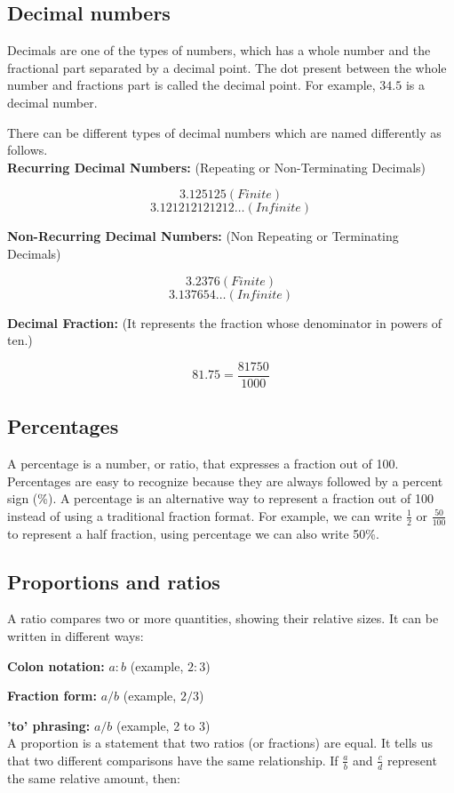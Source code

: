 \documentclass{article} %
\begin{document}
\subsection{Decimal numbers}
Decimals are one of the types of numbers, which has a whole number and the fractional part separated by a decimal point. The dot present between the whole number and fractions part is called the decimal point. For example, $34.5$ is a decimal number.

There can be different types of decimal numbers which are named differently as follows.\\

\textbf{Recurring Decimal Numbers:} (Repeating or Non-Terminating Decimals)

\[
3.125125 (Finite)
\]
\[
3.121212121212\dots (Infinite)
\]

\textbf{Non-Recurring Decimal Numbers:} (Non Repeating or Terminating Decimals)

\[
3.2376 (Finite)
\]
\[
3.137654\dots (Infinite)
\]

\textbf{Decimal Fraction:} (It represents the fraction whose denominator in powers of ten.)

\[
81.75 = \frac{81750}{1000} 
\]

\subsection{Percentages}
A percentage is a number, or ratio, that expresses a fraction out of 100. Percentages are easy to recognize because they are always followed by a percent sign (\%). A percentage is an alternative way to represent a fraction out of 100 instead of using a traditional fraction format. For example, we can write $\frac{1}{2}$ or $\frac{50}{100}$ to represent a half fraction, using percentage we can also write 50\%.

\subsection{Proportions and ratios}
A ratio compares two or more quantities, showing their relative sizes. It can be written in different ways:

\textbf{Colon notation:} $a : b$ (example, $2:3$)

\textbf{Fraction form:} $a / b$ (example, $2 / 3$)

\textbf{'to' phrasing:} $a / b$ (example, 2 to 3)\\

A proportion is a statement that two ratios (or fractions) are equal. It tells us that two different comparisons have the same relationship.
If $\frac{a}{b}$ and $\frac{c}{d}$ represent the same relative amount, then:
\end{document}
